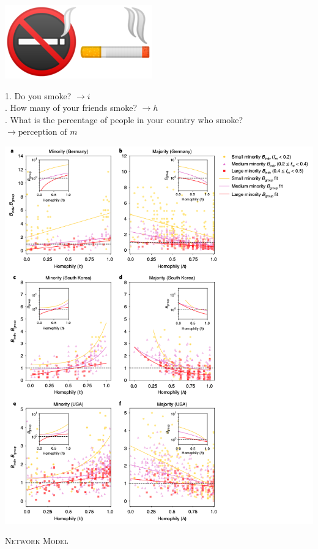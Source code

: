 \documentclass{beamer}
\begin{document}
\begin{frame}
\begin{center}
    \includegraphics[width=.1\textwidth]{static/no-smoke.png}\includegraphics[width=.1\textwidth]{static/smoke.png}
\end{center}
\pause
\Large
1. Do you smoke? $\rightarrow i$ \\ . How many of your friends smoke? $\rightarrow h$ \\ . What is the percentage of people in your country who smoke? $\rightarrow \text{perception of } m$ \\
\end{frame}

\begin{frame}
    \begin{center}
        \includegraphics[width=.55\textwidth]{static/survey_results.png}
    \end{center}
\end{frame}

\begin{frame}
    \centering
    \Large{\textsc{Network Model}} \\ \vspace{1cm}
    \pause
     
\end{frame}
\end{document}
